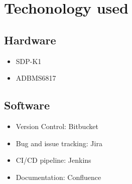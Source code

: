 \chapter{Techonology used} %

\label{ch:tech}


\section{Hardware}
\begin{itemize}
    \item SDP-K1 \cite{sdp}
    \item ADBMS6817 \cite[Public reference]{6817}
\end{itemize}
\section{Software}
\begin{itemize}
    \item Version Control: Bitbucket \cite{bb}
    \item Bug and issue tracking: Jira \cite{jira}
    \item CI/CD pipeline: Jenkins \cite{jenkins}
    \item Documentation: Confluence \cite{conf}
\end{itemize}